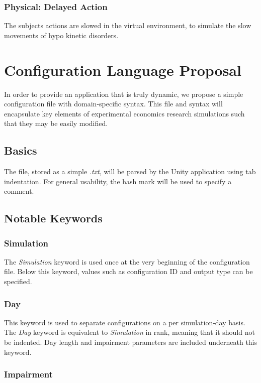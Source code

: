 \documentclass{article}
\begin{document}
\subsubsection*{Physical: Delayed Action}
The subjects actions are slowed in the virtual environment, to simulate the slow movements of hypo kinetic disorders.

\section*{Configuration Language Proposal}

In order to provide an application that is truly dynamic, we propose a simple configuration file with domain-specific syntax. This file and syntax will encapsulate key elements of experimental economics research simulations such that they may be easily modified.

\subsection*{Basics}

The file, stored as a simple \textit{.txt}, will be parsed by the Unity application using tab indentation. For general usability, the hash mark will be used to specify a comment. 

\subsection*{Notable Keywords}

\subsubsection*{Simulation}

The \textit{Simulation} keyword is used once at the very beginning of the configuration file. Below this keyword, values such as configuration ID and output type can be specified.

\subsubsection*{Day}

This keyword is used to separate configurations on a per simulation-day basis. The \textit{Day} keyword is equivalent to \textit{Simulation} in rank, meaning that it should not be indented. Day length and impairment parameters are included underneath this keyword.

\subsubsection*{Impairment}
\end{document}
